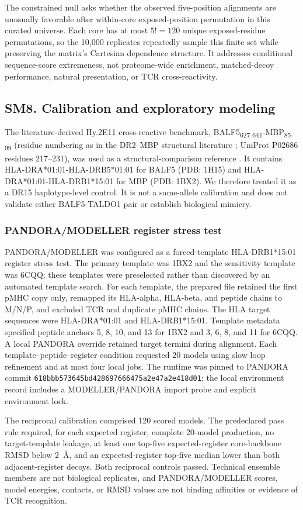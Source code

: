 \documentclass[11pt]{article}
\newcommand{\pep}[2]{#1\textsubscript{#2}}
\begin{document}
The constrained null asks whether the observed five-position alignments are unusually favorable after within-core exposed-position permutation in this curated universe. Each core has at most $5!=120$ unique exposed-residue permutations, so the 10,000 replicates repeatedly sample this finite set while preserving the matrix's Cartesian dependence structure. It addresses conditional sequence-score extremeness, not proteome-wide enrichment, matched-decoy performance, natural presentation, or TCR cross-reactivity.

\subsection{SM8. Calibration and exploratory modeling}
The literature-derived Hy.2E11 cross-reactive benchmark, \pep{BALF5}{627-641}-\pep{MBP}{85-99} (residue numbering as in the DR2--MBP structural literature \cite{gauthier}; UniProt P02686 residues 217--231), was used as a structural-comparison reference \cite{lang}. It contains HLA-DRA*01:01-HLA-DRB5*01:01 for BALF5 (PDB: 1H15) and HLA-DRA*01:01-HLA-DRB1*15:01 for MBP (PDB: 1BX2). We therefore treated it as a DR15 haplotype-level control. It is not a same-allele calibration and does not validate either BALF5-TALDO1 pair or establish biological mimicry.

\subsubsection{PANDORA/MODELLER register stress test}
PANDORA/MODELLER was configured as a forced-template HLA-DRB1*15:01 register stress test. The primary template was 1BX2 and the sensitivity template was 6CQQ; these templates were preselected rather than discovered by an automated template search. For each template, the prepared file retained the first pMHC copy only, remapped its HLA-alpha, HLA-beta, and peptide chains to M/N/P, and excluded TCR and duplicate pMHC chains. The HLA target sequences were HLA-DRA*01:01 and HLA-DRB1*15:01. Template metadata specified peptide anchors 5, 8, 10, and 13 for 1BX2 and 3, 6, 8, and 11 for 6CQQ. A local PANDORA override retained target termini during alignment. Each template--peptide--register condition requested 20 models using slow loop refinement and at most four local jobs. The runtime was pinned to PANDORA commit \texttt{618bbb573645bd428697666475a2e47a2e418d01}; the local environment record includes a MODELLER/PANDORA import probe and explicit environment lock.

The reciprocal calibration comprised 120 scored models. The predeclared pass rule required, for each expected register, complete 20-model production, no target-template leakage, at least one top-five expected-register core-backbone RMSD below 2~\AA{}, and an expected-register top-five median lower than both adjacent-register decoys. Both reciprocal controls passed. Technical ensemble members are not biological replicates, and PANDORA/MODELLER scores, model energies, contacts, or RMSD values are not binding affinities or evidence of TCR recognition.
\end{document}
